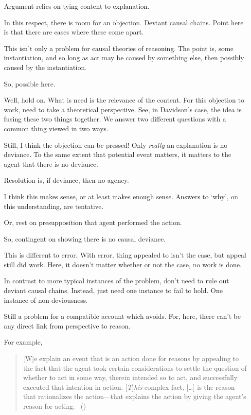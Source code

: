 \begin{note}
  Argument relies on tying content to explanation.

  In this respect, there is room for an objection.
  Deviant causal chains.
  Point here is that there are cases where these come apart.

  This isn't only a problem for causal theories of reasoning.
  The point is, some instantiation, and so long as act may be caused by something else, then possibly caused by the instantiation.

  So, possible here.

  Well, hold on.
  What is need is the relevance of the content.
  For this objection to work, need to take a theoretical perspective.
  See, in Davidson's case, the idea is fusing these two things together.
  We answer two different questions with a common thing viewed in two ways.

  Still, I think the objection can be pressed!
  Only \emph{really} an explanation is no deviance.
  To the same extent that potential event matters, it matters to the agent that there is no deviance.

  {
    \color{red}
    Resolution is, if deviance, then no agency.
  }

  I think this makes sense, or at least makes enough sense.
  Answers to `why', on this understanding, are tentative.

  Or, rest on presupposition that agent performed the action.

  So, contingent on showing there is no causal deviance.

  This is different to error.
  With error, thing appealed to isn't the case, but appeal still did work.
  Here, it doesn't matter whether or not the case, no work is done.

  In contrast to more typical instances of the problem, don't need to rule out deviant causal chains.
  Instead, just need one instance to fail to hold.
  One instance of non-deviousness.

  Still a problem for a compatible account which avoids.
  For, here, there can't be any direct link from perspective to reason.

  For example, \citeauthor{Hieronymi:2011aa}

    \begin{quote}
      [W]e explain an event that is an action done for reasons by appealing to the fact that the agent took certain considerations to settle the question of whether to act in some way, therein intended so to act, and successfully executed that intention in action.
    [\emph{T}]\emph{his} complex fact, [\dots] is the reason that rationalizes the action---that explains the action by giving the agent’s reason for acting.%
    \mbox{ }\hfill\mbox{(\citeyear[431]{Hieronymi:2011aa})}
  \end{quote}


\end{note}

